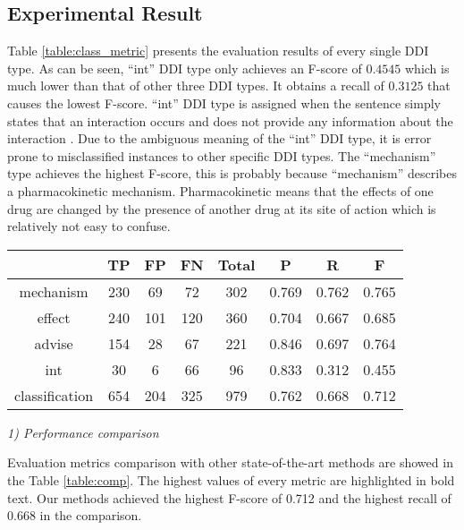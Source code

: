 \documentclass[conference]{IEEEtran}
\begin{document}
\subsection{Experimental Result}

Table \ref{table:class_metric} presents the evaluation results of every single DDI type.
As can be seen, ``int'' DDI type only achieves an F-score of $0.4545$ which is much lower than that of other three DDI types.
It obtains a recall of $0.3125$ that causes the lowest F-score.
``int'' DDI type is assigned when the sentence simply states that an interaction occurs
and does not provide any information about the interaction \cite{segura-bedmar_semeval-2013_2013}.
Due to the ambiguous meaning of the ``int'' DDI type, it is error prone to misclassified instances to other specific DDI types.
The ``mechanism'' type achieves the highest F-score, this is probably because ``mechanism'' describes a pharmacokinetic mechanism.
Pharmacokinetic means that the effects of one drug are changed by the presence of another drug at its site of action which is relatively not easy to confuse.

\begin{table*}
\caption{Detailed evaluation metrics of DDI-UGC.}
\label{table:class_metric}
\begin{center}
\begin{tabular}{cccccccc}
\hline
& TP & FP & FN & Total &P & R & F \\\hline
mechanism &  230 & 69 & 72 & 302 & 0.769 & 0.762 & 0.765\\
effect &  240 & 101 & 120 & 360 & 0.704 & 0.667 & 0.685\\
advise &  154 & 28 & 67 & 221 & 0.846 & 0.697 & 0.764 \\
int &  30 & 6 & 66 & 96 & 0.833 & 0.312 & 0.455\\
classification & 654 & 204 & 325 & 979 & 0.762 & 0.668 & 0.712\\
\hline
\end{tabular}
\end{center}
\end{table*}

\bigbreak
\emph{1) Performance comparison}
\bigbreak

Evaluation metrics comparison with other state-of-the-art methods are showed in the Table \ref{table:comp}.
The highest values of every metric are highlighted in bold text.
Our methods achieved the highest F-score of 0.712 and the highest recall of 0.668 in the comparison.
\end{document}
